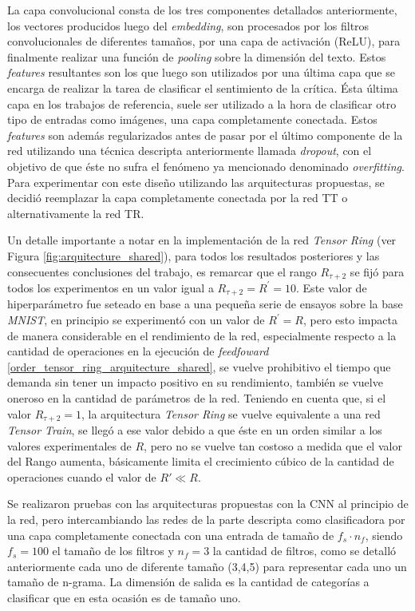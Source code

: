 \documentclass[spanish]{article}
\theoremstyle{definition}
\theoremstyle{remark}
\numberwithin{equation}{section}
\numberwithin{equation}{section} %
\begin{document}
La capa convolucional consta de los tres componentes detallados anteriormente, los vectores producidos luego del \textit{embedding}, son procesados por los filtros convolucionales de diferentes tamaños, por una capa de activación (ReLU), para finalmente realizar una función de \textit{pooling} sobre la dimensión del texto. Estos \textit{features} resultantes son los que luego son utilizados por una última capa que se encarga de realizar la tarea de clasificar el sentimiento de la crítica. Ésta última capa en los trabajos de referencia, suele ser utilizado a la hora de clasificar otro tipo de entradas como imágenes, una capa completamente conectada. Estos \textit{features} son además regularizados antes de pasar por el último componente de la red utilizando una técnica descripta anteriormente llamada \textit{dropout}, con el objetivo de que éste no sufra el fenómeno ya mencionado denominado \textit{overfitting}. Para experimentar con este diseño utilizando las arquitecturas propuestas, se decidió reemplazar la capa completamente conectada por la red TT o alternativamente la red TR. 
\par
Un detalle importante a notar en la implementación de la red \textit{Tensor Ring} (ver Figura \ref{fig:arquitecture_shared}), para todos los resultados posteriores y las consecuentes conclusiones del trabajo, es remarcar que el rango $R_{\tau+2}$ se fijó para todos los experimentos en un valor igual a $R_{\tau+2}=R^\prime=10$. Este valor de hiperparámetro fue seteado en base a una pequeña serie de ensayos sobre la base \textit{MNIST}, en principio se experimentó con un valor de $R^\prime=R$, pero esto impacta de manera considerable en el rendimiento de la red, especialmente respecto a la cantidad de operaciones en la ejecución de \textit{feedfoward} \eqref{order_tensor_ring_arquitecture_shared}, se vuelve prohibitivo el tiempo que demanda sin tener un impacto positivo en su rendimiento, también se vuelve oneroso en la cantidad de parámetros de la red. Teniendo en cuenta que, si el valor $R_{\tau+2}=1$, la arquitectura \textit{Tensor Ring} se vuelve equivalente a una red \textit{Tensor Train}, se llegó a ese valor debido a que éste en un orden similar a los valores experimentales de $R$, pero no se vuelve tan costoso a medida que el valor del Rango aumenta, básicamente limita el crecimiento cúbico de la cantidad de operaciones cuando el valor de $R' \ll R$. 
\par
 Se realizaron pruebas con las arquitecturas propuestas con la CNN al principio de la red, pero intercambiando las redes de la parte descripta como clasificadora por una capa completamente conectada con una entrada de tamaño de $f_s\cdot n_f$, siendo $f_s=100$ el tamaño de los filtros y $n_f=3$ la cantidad de filtros, como se detalló anteriormente cada uno de diferente tamaño (3,4,5) para representar cada uno un tamaño de n-grama. La dimensión de salida es la cantidad de categorías a clasificar que en esta ocasión es de tamaño uno.
\par
\end{document}
